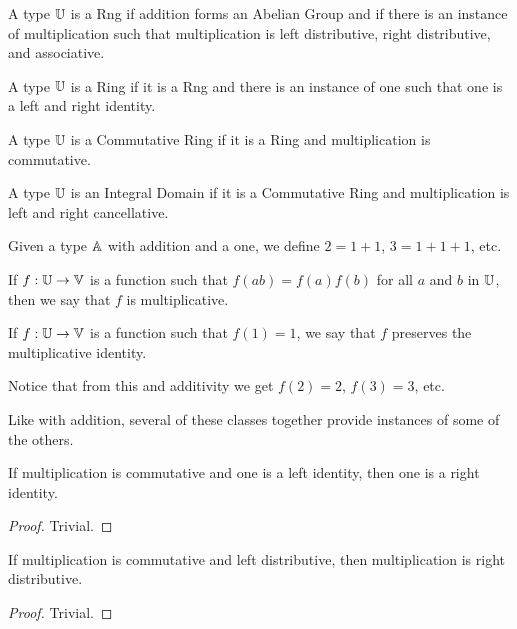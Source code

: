\documentclass[../math.tex]{subfiles}
\begin{document}
\begin{class}[Rng]
    A type $\mathbb{U}$ is a Rng if addition forms an Abelian Group and if there is an
    instance of multiplication such that multiplication is left distributive,
    right distributive, and associative.
\end{class}

\begin{class}[Ring]
    A type $\mathbb{U}$ is a Ring if it is a Rng and there is an instance of one such
    that one is a left and right identity.
\end{class}

\begin{class}
    A type $\mathbb{U}$ is a Commutative Ring if it is a Ring and multiplication is
    commutative.
\end{class}

\begin{class}
    A type $\mathbb{U}$ is an Integral Domain if it is a Commutative Ring and
    multiplication is left and right cancellative.
\end{class}

\begin{definition}
    Given a type $\mathbb{A}$ with addition and a one, we define $2 = 1 + 1$, $3 = 1 +
    1 + 1$, etc.
\end{definition}

\begin{class}
    If $f : \mathbb{U} \to \mathbb{V}$ is a function such that $f(ab) = f(a)f(b)$ for all $a$
    and $b$ in $\mathbb{U}$, then we say that $f$ is multiplicative.
\end{class}

\begin{class}
    If $f : \mathbb{U} \to \mathbb{V}$ is a function such that $f(1) = 1$, we say that $f$
    preserves the multiplicative identity.
\end{class}
Notice that from this and additivity we get $f(2) = 2$, $f(3) = 3$, etc.

Like with addition, several of these classes together provide instances of some
of the others.

\begin{instance}
    If multiplication is commutative and one is a left identity, then one is a
    right identity.
\end{instance}
\begin{proof}
    Trivial.
\end{proof}

\begin{instance} \label{ldist-rdist}
    If multiplication is commutative and left distributive, then multiplication
    is right distributive.
\end{instance}
\begin{proof}
    Trivial.
\end{proof}
\end{document}
